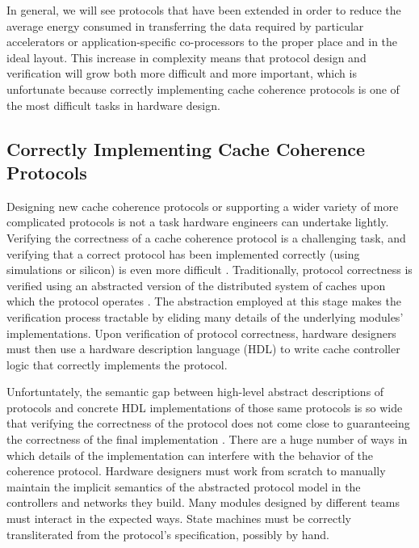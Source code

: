 In general, we will see protocols that have been extended in order to reduce the average energy consumed in transferring the data required by particular accelerators or application-specific co-processors to the proper place and in the ideal layout.
This increase in complexity means that protocol design and verification will grow both more difficult and more important,
which is unfortunate because correctly implementing cache coherence protocols is one of the most difficult tasks in hardware design.

\subsection{Correctly Implementing Cache Coherence Protocols}

Designing new cache coherence protocols or supporting a wider variety of more complicated protocols is not a task hardware engineers can undertake lightly.
Verifying the correctness of a cache coherence protocol is a challenging task, and
verifying that a correct protocol has been implemented correctly (using simulations or silicon) is even more difficult
\cite{deorio2008post, bentley2001validating, burckhardt2005verifying, clarke1995verification, dill1992protocol, wood1990verifying}.
Traditionally, protocol correctness is verified using an abstracted version of the distributed system of caches upon which the protocol operates
\cite{talupur2008going, delzanno2003constraint, pong1997verification, wood1990verifying, mcmillan2001parameterized}.
The abstraction employed at this stage makes the verification process tractable by eliding many details of the underlying modules' implementations.
Upon verification of protocol correctness, hardware designers must then use a hardware description language (HDL) to write cache controller logic that correctly implements the protocol.

Unfortuntately, the semantic gap between high-level abstract descriptions of protocols and 
concrete HDL implementations of those same protocols is so wide that verifying the correctness of the protocol
does not come close to guaranteeing the correctness of the final implementation \cite{dave-memocode05}.
There are a huge number of ways in which details of the implementation can interfere with the behavior of the coherence protocol.
Hardware designers must work from scratch to manually maintain the implicit semantics of the abstracted protocol model in the controllers and networks they build.
Many modules designed by different teams must interact in the expected ways.
State machines must be correctly transliterated from the protocol's specification, possibly by hand.

